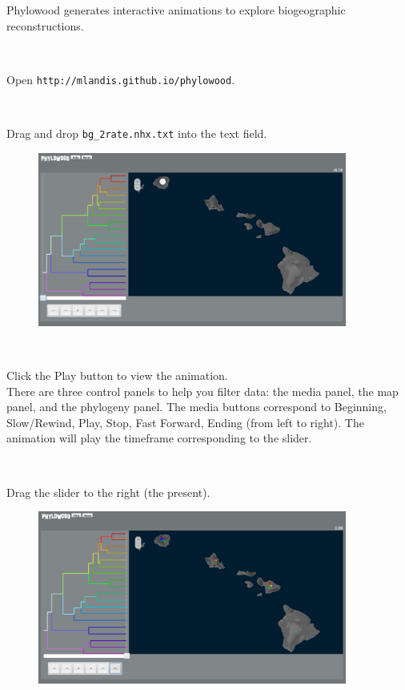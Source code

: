 \documentclass[11pt]{article}
\newcommand{\impmark}{\strut\vadjust{\domark}}
\newcommand{\domark}{%
  \vbox to 0pt{
    \kern-\dp\strutbox
    \smash{\llap{$\rightarrow$\kern1em}}
    \vss
  }%
}
\begin{document}
Phylowood generates interactive animations to explore biogeographic reconstructions.

\noindent \\ \impmark Open \texttt{http://mlandis.github.io/phylowood}.

\noindent \\ \impmark Drag and drop \texttt{bg\_2rate.nhx.txt} into the text field.

\begin{figure}[H]
\centering
\includegraphics[width=4in]{figures/phw_mrca}
\end{figure}

\noindent \\ \impmark Click the Play button to view the animation. \\

There are three control panels to help you filter data: the media panel, the map panel, and the phylogeny panel.
The media buttons correspond to Beginning, Slow/Rewind, Play, Stop, Fast Forward, Ending (from left to right).
The animation will play the timeframe corresponding to the slider.

\noindent \\ \impmark Drag the slider to the right (the present).

\begin{figure}[H]
\centering
\includegraphics[width=4in]{figures/phw_all}
\end{figure}
\end{document}

